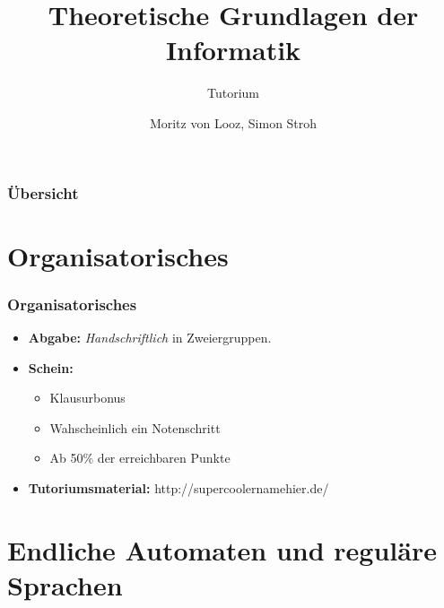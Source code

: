 \documentclass{beamer}
\title{Theoretische Grundlagen der Informatik}
\subtitle{Tutorium}
\author{Moritz von Looz, Simon Stroh}
\institute[ITI]{Intitute für Theoretische Informatik}
\begin{document}
\begin{frame}
  \maketitle
\end{frame}

\begin{frame}
  \frametitle{Übersicht}
  \tableofcontents
\end{frame}

\section{Organisatorisches}
\begin{frame}
	\frametitle{Organisatorisches}
	\begin{itemize}
		\item \textbf{Abgabe:} \emph{Handschriftlich} in Zweiergruppen.
		\item \textbf{Schein:} 
		\begin{itemize}
			\item Klausurbonus
			\item Wahscheinlich ein Notenschritt
			\item Ab 50\% der erreichbaren Punkte
		\end{itemize}
		\item \textbf{Tutoriumsmaterial:} http://supercoolernamehier.de/ %
	\end{itemize}
\end{frame}
\section{Endliche Automaten und reguläre Sprachen}
\end{document}
